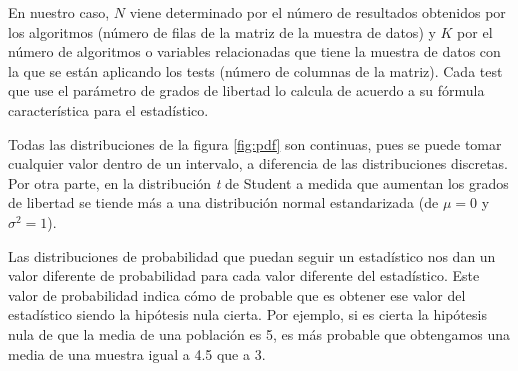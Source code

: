 En nuestro caso, $N$ viene determinado por el número de resultados obtenidos por los algoritmos (número de filas
de la matriz de la muestra de datos) y $K$ por el número de algoritmos o variables relacionadas que tiene la muestra
de datos con la que se están aplicando los tests (número de columnas de la matriz). Cada test que use el parámetro
de grados de libertad lo calcula de acuerdo a su fórmula característica para el estadístico. 

Todas las distribuciones de la figura \ref{fig:pdf} son continuas, pues se puede tomar cualquier valor dentro de un
intervalo, a diferencia de las distribuciones discretas. Por otra parte, en la distribución \textit{t} de Student a medida que
aumentan los grados de libertad se tiende más a una distribución normal estandarizada (de $\mu = 0$ y $\sigma^2 = 1$).

Las distribuciones de probabilidad que puedan seguir un estadístico nos dan un valor diferente de probabilidad para
cada valor diferente del estadístico. Este valor de probabilidad indica cómo de probable que es obtener ese valor del
estadístico siendo la hipótesis nula cierta. Por ejemplo, si es cierta la hipótesis nula de que la media de una población
es 5, es más probable que obtengamos una media de una muestra igual a 4.5 que a 3.


